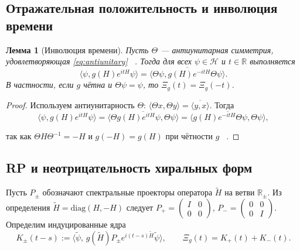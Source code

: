 \documentclass{article}
\numberwithin{equation}{section}
\theoremstyle{plain}
\newtheorem{lemma}{Лемма}
\theoremstyle{definition}
\theoremstyle{remark}
\begin{document}
\subsection{Отражательная положительность и инволюция времени}
\label{subsec:time_reflection}

\begin{lemma}[Инволюция времени]
\label{lem:time_reflection}
Пусть $\Theta$ --- антиунитарная симметрия, удовлетворяющая \eqref{eq:antiunitary} ~\cite{Wigner1959}.
Тогда для всех $\psi\in\mathcal H$ и $t\in\mathbb R$ выполняется
\begin{equation}
\label{eq:time_reflection}
\langle\psi,g(H)e^{itH}\psi\rangle
=\overline{\langle\Theta\psi,g(H)e^{-itH}\Theta\psi\rangle}.
\end{equation}
В частности, если $g$ чётна и $\Theta\psi=\psi$, то $\Xi_g(t)=\Xi_g(-t)$.
\end{lemma}

\begin{proof}
Используем антиунитарность $\Theta$: $\langle\Theta x,\Theta y\rangle=\overline{\langle y,x\rangle}$.
Тогда
\begin{equation}
\langle\psi,g(H)e^{itH}\psi\rangle
=\overline{\langle\Theta g(H)e^{itH}\psi,\Theta\psi\rangle}
=\overline{\langle g(H)e^{-itH}\Theta\psi,\Theta\psi\rangle},
\label{eq:QSSC0032}
\end{equation}

так как $\Theta H\Theta^{-1}=-H$ и $g(-H)=g(H)$ при чётности $g$ ~\cite{Messiah1961}.
\end{proof}

\subsection{RP и неотрицательность хиральных форм}
\label{subsec:positivity_hiral}

Пусть $P_\pm$ обозначают спектральные проекторы оператора $\widetilde H$ на ветви $\mathbb R_\pm$.
Из определения $\widetilde H=\mathrm{diag}(H,-H)$ следует $P_+=\begin{pmatrix}I&0\\0&0\end{pmatrix}$, $P_-=\begin{pmatrix}0&0\\0&I\end{pmatrix}$.
Определим индуцированные ядра
\begin{equation}
K_\pm(t-s):=\langle\widetilde\psi,\,g(\widetilde H)P_\pm e^{i(t-s)\widetilde H}\widetilde\psi\rangle,
\qquad
\Xi_g(t)=K_+(t)+K_-(t).
\label{eq:QSSC0033}
\end{equation}
\end{document}
